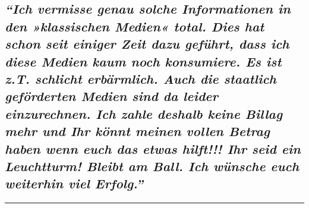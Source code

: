 \hypertarget{ich-vermisse-genau-solche-informationen-in-den-klassischen-medien-total-dies-hat-schon-seit-einiger-zeit-dazu-gefuxfchrt-dass-ich-diese-medien-kaum-noch-konsumiere-es-ist-zt-schlicht-erbuxe4rmlich-auch-die-staatlich-gefuxf6rderten-medien-sind-da-leider-einzurechnen-ich-zahle-deshalb-keine-billag-mehr-und-ihr-kuxf6nnt-meinen-vollen-betrag-haben-wenn-euch-das-etwas-hilft-ihr-seid-ein-leuchtturm-bleibt-am-ball-ich-wuxfcnsche-euch-weiterhin-viel-erfolg}{%
\subsection{\texorpdfstring{\emph{``Ich vermisse genau solche
Informationen in den »klassischen Medien« total. Dies hat schon seit
einiger Zeit dazu geführt, dass ich diese Medien kaum noch konsumiere.
Es ist z.T. schlicht erbärmlich. Auch die staatlich geförderten Medien
sind da leider einzurechnen. Ich zahle deshalb keine Billag mehr und Ihr
könnt meinen vollen Betrag haben wenn euch das etwas hilft!!! Ihr seid
ein Leuchtturm! Bleibt am Ball. Ich wünsche euch weiterhin viel
Erfolg.''}}{``Ich vermisse genau solche Informationen in den »klassischen Medien« total. Dies hat schon seit einiger Zeit dazu geführt, dass ich diese Medien kaum noch konsumiere. Es ist z.T. schlicht erbärmlich. Auch die staatlich geförderten Medien sind da leider einzurechnen. Ich zahle deshalb keine Billag mehr und Ihr könnt meinen vollen Betrag haben wenn euch das etwas hilft!!! Ihr seid ein Leuchtturm! Bleibt am Ball. Ich wünsche euch weiterhin viel Erfolg.''}}\label{ich-vermisse-genau-solche-informationen-in-den-klassischen-medien-total-dies-hat-schon-seit-einiger-zeit-dazu-gefuxfchrt-dass-ich-diese-medien-kaum-noch-konsumiere-es-ist-zt-schlicht-erbuxe4rmlich-auch-die-staatlich-gefuxf6rderten-medien-sind-da-leider-einzurechnen-ich-zahle-deshalb-keine-billag-mehr-und-ihr-kuxf6nnt-meinen-vollen-betrag-haben-wenn-euch-das-etwas-hilft-ihr-seid-ein-leuchtturm-bleibt-am-ball-ich-wuxfcnsche-euch-weiterhin-viel-erfolg}}

\begin{center}\rule{0.5\linewidth}{\linethickness}\end{center}

